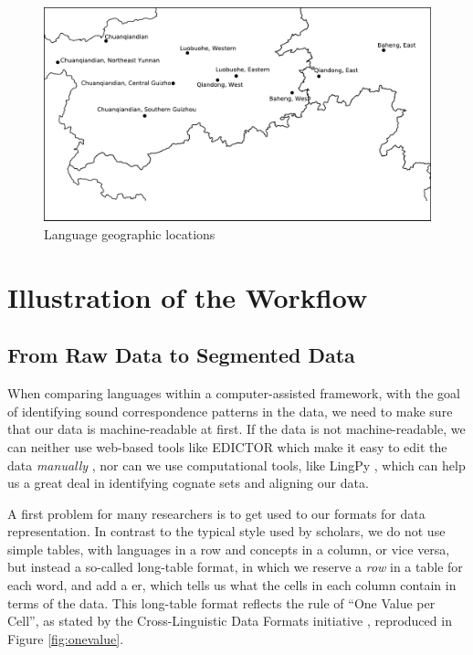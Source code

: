 \documentclass[xetex,svgnames]{scrartcl}
\begin{document}
\begin{figure}[htb]
  \centering
  \includegraphics[width=\textwidth]{Geographic.pdf}
  \caption{Language geographic locations}
  \label{fig:geo}
\end{figure}

\section{Illustration of the Workflow}\label{sec:wf}
\subsection{From Raw Data to Segmented Data}
When comparing languages within a computer-assisted framework, with the goal of identifying sound
correspondence patterns in the data, we need to make sure that our data is machine-readable at
first. If the data is not machine-readable, we can neither use web-based tools like EDICTOR which
make it easy to edit the data \emph{manually} \citep{List2017d}, nor can we use computational tools,
like LingPy \citep{List2018i}, which can help us a great deal in identifying cognate sets and
aligning our data.

A first problem for many researchers is to get used to our formats for data representation. 
In contrast to the typical style used by scholars, we do not use simple tables, with languages in a
row and concepts in a column, or vice versa, but instead a so-called long-table format, in which we
reserve a \emph{row} in a table for each word, and add a er, which tells us what the cells in
each column contain in terms of the data. This long-table format reflects the rule of
``One Value per Cell'', as stated by the Cross-Linguistic Data Formats initiative
\citep{Forkel2018a}, reproduced in Figure \ref{fig:onevalue}. 
\end{document}
